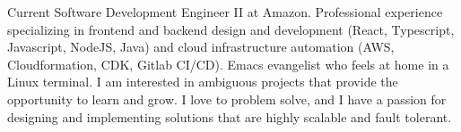 

\begin{cvparagraph}

Current Software Development Engineer II at Amazon. Professional experience specializing in frontend and backend design and development (React, Typescript, Javascript, NodeJS, Java) and cloud infrastructure automation (AWS, Cloudformation, CDK, Gitlab CI/CD). Emacs evangelist who feels at home in a Linux terminal. I am interested in ambiguous projects that provide the opportunity to learn and grow. I love to problem solve, and I have a passion for designing and implementing solutions that are highly scalable and fault tolerant.
\end{cvparagraph}
